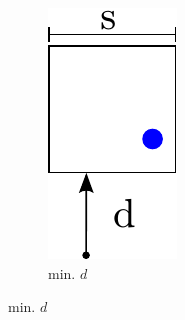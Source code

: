 \begin{figure}
    \hspace{0.75cm}
    \begin{subfigure}{0.15\columnwidth}
        \centering
        \includegraphics[width=\textwidth]{figures/mac_2}
        \caption{min. $d$}
        \label{fig:tree:mac:2}
    \end{subfigure}

\end{figure}

